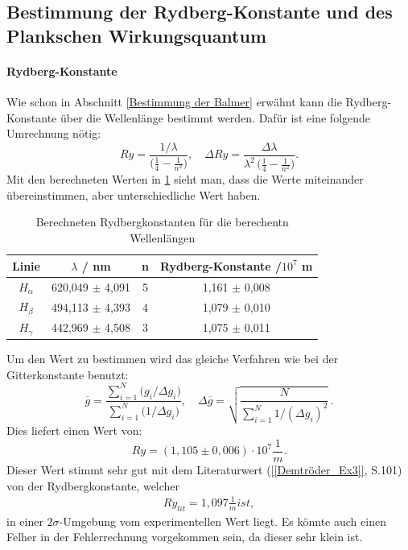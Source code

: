 \subsection{Bestimmung der Rydberg-Konstante und des Plankschen Wirkungsquantum}
\paragraph{Rydberg-Konstante} \label{Rydberg-konst}
Wie schon in Abschnitt \ref{Bestimmung der Balmer} erwähnt kann die Rydberg-Konstante über die Wellenlänge bestimmt werden.
Dafür ist eine folgende Umrechnung nötig:
\begin{equation}
  Ry
  = \frac{1/\lambda}{\bigl(\tfrac{1}{4} - \tfrac{1}{n^{2}}\bigr)},
  \quad
  \Delta Ry
  = \frac{\Delta\lambda}{\lambda^{2}\,\bigl(\tfrac{1}{4} - \tfrac{1}{n^{2}}\bigr)}.
\end{equation}
Mit den berechneten Werten in \cref{tab:Rydberg} sieht man, dass die Werte miteinander übereinstimmen, aber unterschiedliche Wert haben. 

\begin{table}[htbp]
    \centering
    \begin{tabular}{|c|c|c|c|}
        Linie & $\lambda$ / nm & n & Rydberg-Konstante /$10^7$ m \\
        \hline
        $H_\alpha$ & 620,049 $\pm$ 4,091 & 5 & 1,161 $\pm$ 0,008 \\
        $H_\beta$ & 494,113 $\pm$ 4,393 & 4 & 1,079 $\pm$ 0,010  \\
        $H_\gamma$ & 442,969 $\pm$ 4,508 & 3 & 1,075 $\pm$ 0,011 \\
    \end{tabular}
    \caption{Berechneten Rydbergkonstanten für die berechentn Wellenlängen}
    \label{tab:Rydberg}
\end{table}

Um den Wert zu bestimmen wird das gleiche Verfahren wie bei der Gitterkonstante benutzt:
\begin{equation}
  \overline{g}
  = \frac{\sum_{i=1}^{N} \bigl(g_i/\Delta g_i\bigr)}
         {\sum_{i=1}^{N} \bigl(1/\Delta g_i\bigr)},
  \quad
  \Delta\overline{g}
  = \sqrt{\frac{N}{\sum_{i=1}^{N} 1/(\Delta g_i)^{2}}}\,.
\end{equation}
Dies liefert einen Wert von:
\begin{equation}
    Ry = (1,105 \pm 0,006)\cdot 10^7 \frac{1}{m}.
\end{equation}
Dieser Wert stimmt sehr gut mit dem Literaturwert (\cref{[Demtröder_Ex3]}, S.101) von der Rydbergkonstante, welcher
\begin{align}
    Ry_{lit} = 1,097 \frac{1}{m} ist,
\end{align}
in einer $2\sigma$-Umgebung vom experimentellen Wert liegt.
Es könnte auch einen Felher in der Fehlerrechnung vorgekommen sein, da dieser sehr klein ist.

